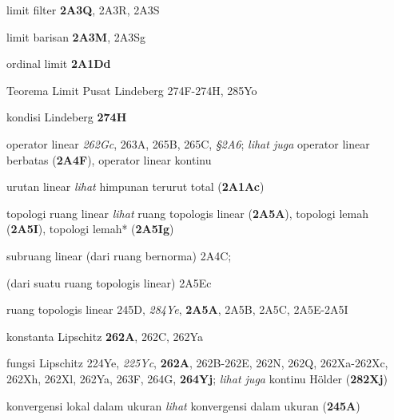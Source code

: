 















limit filter {\bf 2A3Q}, 2A3R, 2A3S


limit barisan {\bf 2A3M}, 2A3Sg




ordinal limit {\bf 2A1Dd}


Teorema Limit Pusat Lindeberg 274F-274H, 
285Yo


kondisi Lindeberg {\bf 274H}












\ifdim\pagewidth>467pt\fi
operator linear {\it 262Gc}, 263A, 265B, 265C, {\it \S2A6};  
  {\it lihat juga} operator linear berbatas ({\bf 2A4F}),
operator linear kontinu  

\tenrm=1.67pt

urutan linear {\it lihat} himpunan terurut total ({\bf 2A1Ac})




topologi ruang linear {\it lihat} ruang topologis linear ({\bf 2A5A}), topologi lemah ({\bf 2A5I}), topologi lemah* ({\bf 2A5Ig})


subruang linear (dari ruang bernorma) 2A4C;
  
  (dari suatu ruang topologis linear) 2A5Ec


ruang topologis linear 245D, {\it 284Ye}, {\bf 2A5A}, 2A5B, 2A5C,
2A5E-2A5I









konstanta Lipschitz {\bf 262A}, 262C, 262Ya


fungsi Lipschitz 224Ye, {\it 225Yc}, {\bf 262A},
262B-262E, 
262N, 262Q, 262Xa-262Xc, 
262Xh, 262Xl, 262Ya, 263F, 264G, {\bf 264Yj}; 
  {\it lihat juga} kontinu H\"older ({\bf 282Xj})




konvergensi lokal dalam ukuran {\it lihat} konvergensi dalam ukuran ({\bf 245A})








